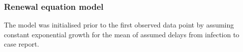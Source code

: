 % 
% 
% 
% 

\hypertarget{renewal-equation-model}{%
\subsubsection*{Renewal equation model}\label{renewal-equation-model}}

The model was initialised prior to the first observed data point by assuming constant exponential growth for the mean of assumed delays from infection to case report.

